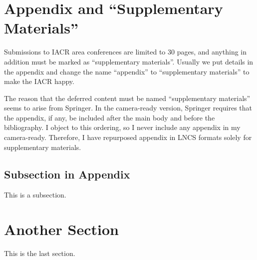 \section{Appendix and ``Supplementary Materials''}

Submissions to IACR area conferences are limited to 30 pages, and
anything in addition must be marked as ``supplementary materials''.
Usually we put details in the appendix and
change the name ``appendix'' to ``supplementary materials''
to make the IACR happy.

The reason that the deferred content must be named ``supplementary materials''
seems to arise from Springer.
In the camera-ready version,
Springer requires that the appendix, if any,
be included after the main body and before the bibliography.
I object to this ordering,
so I never include any appendix in my camera-ready.
Therefore, I have repurposed appendix in LNCS formats
solely for supplementary materials.

\subsection{Subsection in Appendix}

This is a subsection.

\section{Another Section}

This is the last section.
